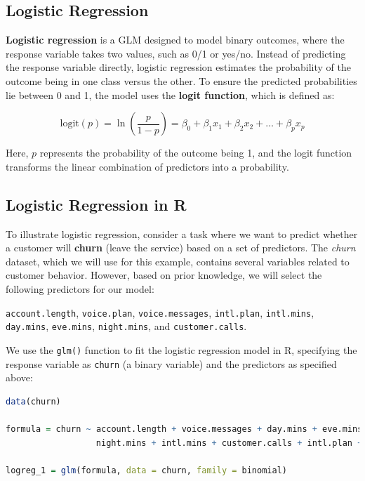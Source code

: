 \documentclass[
]{book}
\newcommand{\passthrough}[1]{#1}
\theoremstyle{definition}
\theoremstyle{definition}
\theoremstyle{definition}
\theoremstyle{definition}
\theoremstyle{remark}
\begin{document}
\subsection{Logistic Regression}\label{logistic-regression}

\textbf{Logistic regression} is a GLM designed to model binary outcomes, where the response variable takes two values, such as 0/1 or yes/no. Instead of predicting the response variable directly, logistic regression estimates the probability of the outcome being in one class versus the other. To ensure the predicted probabilities lie between 0 and 1, the model uses the \textbf{logit function}, which is defined as:

\[
\text{logit}(p) = \ln\left(\frac{p}{1-p}\right) = \beta_0 + \beta_1 x_1 + \beta_2 x_2 + \dots + \beta_p x_p
\]

Here, \(p\) represents the probability of the outcome being 1, and the logit function transforms the linear combination of predictors into a probability.

\subsection{Logistic Regression in R}\label{logistic-regression-in-r}

To illustrate logistic regression, consider a task where we want to predict whether a customer will \textbf{churn} (leave the service) based on a set of predictors. The \emph{churn} dataset, which we will use for this example, contains several variables related to customer behavior. However, based on prior knowledge, we will select the following predictors for our model:

\passthrough{\lstinline!account.length!}, \passthrough{\lstinline!voice.plan!}, \passthrough{\lstinline!voice.messages!}, \passthrough{\lstinline!intl.plan!}, \passthrough{\lstinline!intl.mins!}, \passthrough{\lstinline!day.mins!}, \passthrough{\lstinline!eve.mins!}, \passthrough{\lstinline!night.mins!}, and \passthrough{\lstinline!customer.calls!}.

We use the \passthrough{\lstinline!glm()!} function to fit the logistic regression model in R, specifying the response variable as \passthrough{\lstinline!churn!} (a binary variable) and the predictors as specified above:

\begin{lstlisting}[language=R]
data(churn)

formula = churn ~ account.length + voice.messages + day.mins + eve.mins + 
                  night.mins + intl.mins + customer.calls + intl.plan + voice.plan

logreg_1 = glm(formula, data = churn, family = binomial)
\end{lstlisting}
\end{document}
